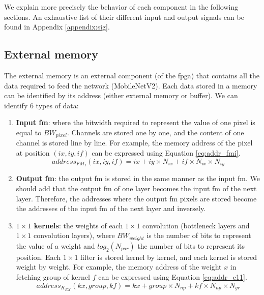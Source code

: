 We explain more precisely the behavior of each component in the following sections. An exhaustive list of their different input and output signals can be found in Appendix \ref{appendix:sig}.
%
\subsection{External memory} \label{subs:extmem}
%
The external memory is an external component (of the \acrshort{fpga}) that contains all the data required to feed the network (MobileNetV2). Each data stored in a memory can be identified by its address (either external memory or buffer). We can identify 6 types of data:
%
\begin{enumerate}
    \item \textbf{Input \acrshort{fm}}: where the bitwidth required to represent the value of one pixel is equal to $BW_{pixel}$. Channels are stored one by one, and the content of one channel is stored line by line. For example, the memory address of the pixel at position $\left(ix, iy, if\right)$ can be expressed using Equation \eqref{eq:addr_fmi}.
    \begin{equation}
        address_{FM_{I}}(ix, iy, if) = ix + iy \times N_{ix} + if \times N_{ix} \times N_{iy}
        \label{eq:addr_fmi}
    \end{equation}
    \item \textbf{Output \acrshort{fm}}: the output \acrshort{fm} is stored in the same manner as the input \acrshort{fm}. We should add that the output \acrshort{fm} of one layer becomes the input \acrshort{fm} of the next layer. Therefore, the addresses where the output \acrshort{fm} pixels are stored become the addresses of the input \acrshort{fm} of the next layer and inversely.
    \item \textbf{$1 \times 1$ kernels}: the weights of each $1 \times 1$ convolution (bottleneck layers and $1 \times 1$ convolution layers), where $BW_{weight}$ is the number of bits to represent the value of a weight and $log_2(N_{par})$ the number of bits to represent its position. Each $1 \times 1$ filter is stored kernel by kernel, and each kernel is stored weight by weight. For example, the memory address of the weight $x$ in fetching group  of kernel $f$ can be expressed using Equation \eqref{eq:addr_c11}.
    \begin{equation}
        address_{K_{EX}}(kx, group, kf) = kx + group \times N_{np} + kf \times N_{np} \times N_{gr}
        \label{eq:addr_c11}
    \end{equation}

\end{enumerate}
